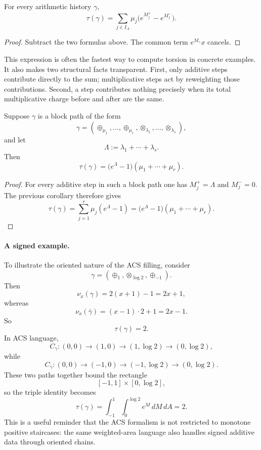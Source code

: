\begin{corollary}
\label{cor:appC-explicit-torsion-formula}
For every arithmetic history $\gamma$,
\[
\tau(\gamma)
 =\sum_{j\in I_A}\mu_j\bigl(e^{M_j^+}-e^{M_j^-}\bigr).
\]
\end{corollary}

\begin{proof}
Subtract the two formulas above. The common term $e^{M_\gamma}x$ cancels.
\end{proof}

This expression is often the fastest way to compute torsion in concrete examples. It also makes two structural facts transparent.
First, only additive steps contribute directly to the sum; multiplicative steps act by reweighting those contributions. Second, a step contributes nothing precisely when its total multiplicative charge before and after are the same.

\begin{corollary}
\label{cor:appC-block-paths}
Suppose $\gamma$ is a block path of the form
\[
\gamma=(\oplus_{\mu_1},\dots,\oplus_{\mu_r},\otimes_{\lambda_1},\dots,\otimes_{\lambda_s}),
\]
and let
\[
\Lambda:=\lambda_1+\cdots+\lambda_s.
\]
Then
\[
\tau(\gamma)=\bigl(e^{\Lambda}-1\bigr)(\mu_1+\cdots+\mu_r).
\]
\end{corollary}

\begin{proof}
For every additive step in such a block path one has $M_j^+=\Lambda$ and $M_j^-=0$. The previous corollary therefore gives
\[
\tau(\gamma)
 =\sum_{j=1}^r \mu_j(e^{\Lambda}-1)
 =\bigl(e^{\Lambda}-1\bigr)(\mu_1+\cdots+\mu_r).
\]
\end{proof}

\paragraph{A signed example.}
To illustrate the oriented nature of the ACS filling, consider
\[
\gamma=(\oplus_1,\otimes_{\log 2},\oplus_{-1}).
\]
Then
\[
\nu_x(\gamma)=2(x+1)-1=2x+1,
\]
whereas
\[
\nu_x(\bar\gamma)=(x-1)\cdot 2+1=2x-1.
\]
So
\[
\tau(\gamma)=2.
\]
In ACS language,
\[
C_\gamma:(0,0)\to(1,0)\to(1,\log 2)\to(0,\log 2),
\]
while
\[
C_{\bar\gamma}:(0,0)\to(-1,0)\to(-1,\log 2)\to(0,\log 2).
\]
These two paths together bound the rectangle
\[
[-1,1]\times[0,\log 2],
\]
so the triple identity becomes
\[
\tau(\gamma)
 =\int_{-1}^1\int_0^{\log 2} e^M\,dM\,dA
 =2.
\]
This is a useful reminder that the ACS formalism is not restricted to monotone positive staircases: the same weighted-area language also handles signed additive data through oriented chains.
